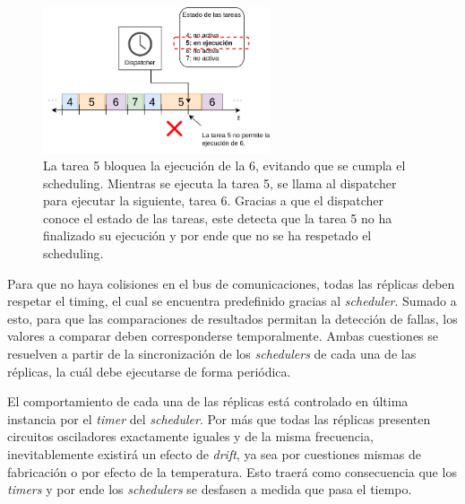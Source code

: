 \begin{figure}[H]
    \centering
    \includegraphics[width=0.6\textwidth]{img/task_overrun.png}
    \caption{La tarea 5 bloquea la ejecución de la 6, evitando que se cumpla el scheduling. Mientras se ejecuta la tarea 5, se llama al dispatcher para ejecutar la siguiente, tarea 6. Gracias a que el dispatcher conoce el estado de las tareas, este detecta que la tarea 5 no ha finalizado su ejecución y por ende que no se ha respetado el scheduling.}
    \label{fig:task_overrun}
\end{figure}




Para que no haya colisiones en el bus de comunicaciones, todas las réplicas deben respetar el timing, el cual se encuentra predefinido gracias al \textit{scheduler}. Sumado a esto, para que las comparaciones de resultados permitan la detección de fallas, los valores a comparar deben corresponderse temporalmente. Ambas cuestiones se resuelven a partir de la sincronización de los \textit{schedulers} de cada una de las réplicas, la cuál debe ejecutarse de forma periódica.

El comportamiento de cada una de las réplicas está controlado en última instancia por el \textit{timer} del \textit{scheduler}. Por más que todas las réplicas presenten circuitos osciladores exactamente iguales y de la misma frecuencia, inevitablemente existirá un efecto de \textit{drift}, ya sea por cuestiones mismas de fabricación o por efecto de la temperatura. Esto traerá como consecuencia que los \textit{timers} y por ende los \textit{schedulers} se desfasen a medida que pasa el tiempo. 

